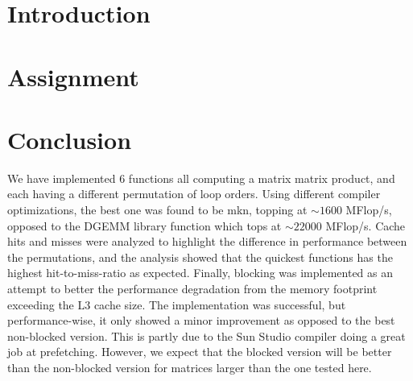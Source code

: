 


\newpage
\tableofcontents
\thispagestyle{empty}
\setcounter{page}{0}
\newpage
\section{Introduction}


\section{Assignment}









\section{Conclusion}
We have implemented 6 functions all computing a matrix matrix product, and each having a different permutation of loop orders. Using different compiler optimizations, the best one was found to be mkn, topping at $\sim 1600$ MFlop/s, opposed to the DGEMM library function which tops at $\sim 22000$ MFlop/s. Cache hits and misses were analyzed to highlight the difference in performance between the permutations, and the analysis showed that the quickest functions has the highest hit-to-miss-ratio as expected. Finally, blocking was implemented as an attempt to better the performance degradation from the memory footprint exceeding the L3 cache size. The implementation was successful, but performance-wise, it only showed a minor improvement as opposed to the best non-blocked version. This is partly due to the Sun Studio compiler doing a great job at prefetching. However, we expect that the blocked version will be better than the non-blocked version for matrices larger than the one tested here.

